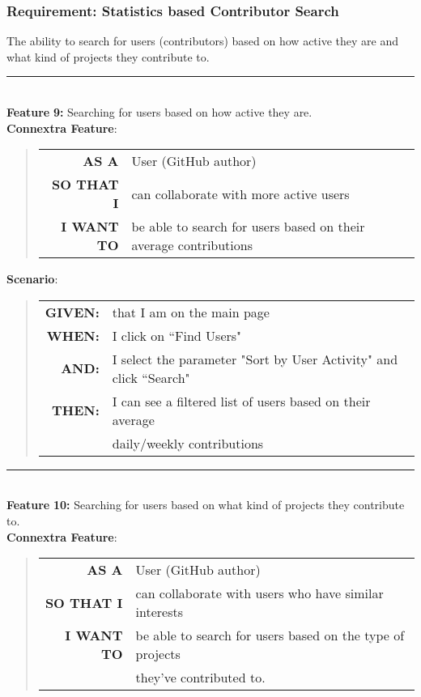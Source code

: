 \documentclass[12pt]{article}
\newcommand{\Feature}[1]{ 
   \noindent \textbf{Feature} #1
}
\newcommand{\GivenSc} {
	\noindent \textbf{GIVEN:}
	}
\newcommand{\WhenSc} {
	\noindent \textbf{WHEN:}
	}
\newcommand{\AndSc} {
	\noindent \textbf{AND:}
	}
\newcommand{\ThenSc} {
	\noindent \textbf{THEN:}
	}
\begin{document}
\pagebreak
\begin{framed}
\subsubsection{Requirement: Statistics based Contributor Search}
The ability to search for users (contributors) based on how active they are and what kind of projects they contribute to.\\[0.2cm]

\hrule~\\

\noindent \Feature{\textbf{9:} Searching for users based on how active they are.}\\[0.2cm]

\noindent \textbf{Connextra Feature}:
\begin{quote}
\begin{tabular}{rl}
\textbf{AS A}      & User (\textsf{GitHub} author)\\
\textbf{SO THAT I} & can collaborate with more active users\\
\textbf{I WANT TO} & be able to search for users based on their average contributions
\end{tabular}
\end{quote}

\noindent \textbf{Scenario}:
\begin{quote}
\begin{tabular}{rl}
\GivenSc & that I am on the main page\\
\WhenSc  & I click on ``Find Users"\\
\AndSc   & I select the parameter "Sort by User Activity" and click ``Search"\\
\ThenSc  & I can see a filtered list of users based on their average \\ 
         & daily/weekly contributions 
\end{tabular}
\end{quote}

\hrule~\\

\noindent \Feature{\textbf{10:} Searching for users based on what kind of projects they contribute to.}\\[0.2cm]

\noindent \textbf{Connextra Feature}:
\begin{quote}
\begin{tabular}{rl}
\textbf{AS A}      & User (\textsf{GitHub} author)\\
\textbf{SO THAT I} & can collaborate with users who have similar interests\\
\textbf{I WANT TO} & be able to search for users based on the type of projects \\
                   & they've contributed to.
\end{tabular}
\end{quote}


\end{framed}
\end{document}
